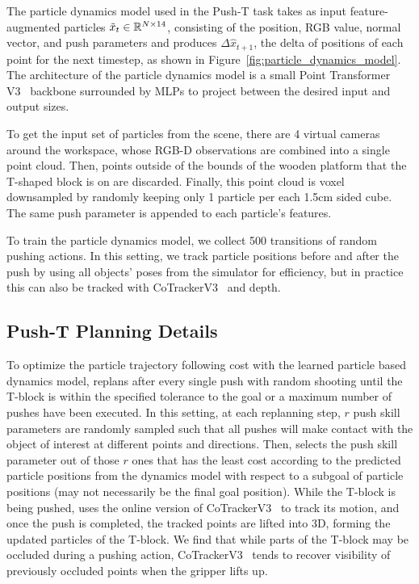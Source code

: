 The particle dynamics model used in the Push-T task takes as input feature-augmented particles $\Tilde{x}_t \in \mathbb{R}^{N \times 14}$, consisting of the position, RGB value, normal vector, and push parameters and produces $\Delta \hat{x}_{t+1}$, the delta of positions of each point for the next timestep, as shown in Figure~\ref{fig:particle_dynamics_model}. The architecture of the particle dynamics model is a small Point Transformer V3~\cite{wu2024ptv3} backbone surrounded by MLPs to project between the desired input and output sizes. 

To get the input set of particles from the scene, there are 4 virtual cameras around the workspace, whose RGB-D observations are combined into a single point cloud. Then, points outside of the bounds of the wooden platform that the T-shaped block is on are discarded. Finally, this point cloud is voxel downsampled by randomly keeping only 1 particle per each 1.5cm sided cube. The same push parameter is appended to each particle's features. 

To train the particle dynamics model, we collect 500 transitions of random pushing actions. In this setting, we track particle positions before and after the push by using all objects' poses from the simulator for efficiency, but in practice this can also be tracked with CoTrackerV3~\cite{karaev2024cotracker3} and depth. 

\subsection{Push-T Planning Details}
\label{sec:pusht_planning}
To optimize the particle trajectory following cost with the learned particle based dynamics model, \algo replans after every single push with random shooting until the T-block is within the specified tolerance to the goal or a maximum number of pushes have been executed. In this setting, at each replanning step, $r$ push skill parameters are randomly sampled such that all pushes will make contact with the object of interest at different points and directions. Then, \algo selects the push skill parameter out of those $r$ ones that has the least cost according to the predicted particle positions from the dynamics model with respect to a subgoal of particle positions (may not necessarily be the final goal position). While the T-block is being pushed, \algo uses the online version of CoTrackerV3~\cite{karaev2024cotracker3} to track its motion, and once the push is completed, the tracked points are lifted into 3D, forming the updated particles of the T-block. We find that while parts of the T-block may be occluded during a pushing action, CoTrackerV3~\cite{karaev2024cotracker3} tends to recover visibility of previously occluded points when the gripper lifts up.

